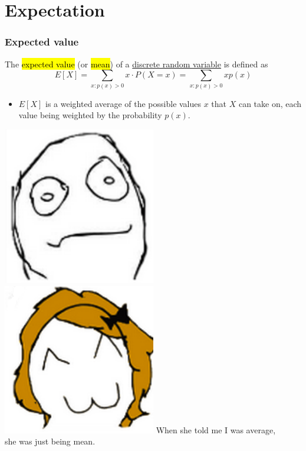 \documentclass[slidestop,compress,mathserif]{beamer}
\begin{document}
\section{Expectation}
\begin{frame}
\frametitle{Expected value}
\begin{defn}
The \hl{expected value} (or \hl{mean}) of a \underline{discrete random variable} is defined as
\[E[X] = \sum_{x: p(x) > 0} x\cdot P(X = x)= \sum_{x: p(x) > 0} x p(x)\]
\end{defn}


\begin{itemize}
\item $E[X]$ is a weighted average of the possible values $x$ that $X$ can take on,
each value being weighted by the probability $p(x) $.
\end{itemize}

\vspace{0.5cm}
{
\includegraphics[width = 0.5\textwidth]{figures/joke1}
\includegraphics[width = 0.5\textwidth]{figures/joke2}
}
{
When she told me I was average, \\
she was just being mean.
}


\end{frame}
\end{document}
